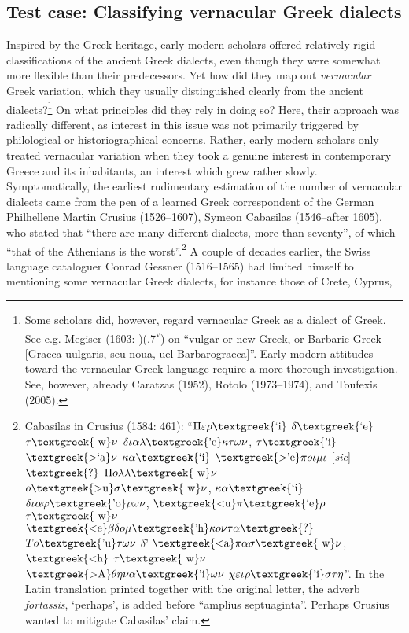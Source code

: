 \subsection{Test case: Classifying vernacular Greek dialects}
\hypertarget{Toc19704816}{}\begin{styleStandard}
Inspired by the Greek heritage, early modern scholars offered relatively rigid classifications of the ancient Greek dialects, even though they were somewhat more flexible than their predecessors. Yet how did they map out \textit{vernacular} Greek variation, which they usually distinguished clearly from the ancient dialects?\footnote{ Some scholars did, however, regard vernacular Greek as a dialect of Greek. See e.g. Megiser (1603: )(.7\textsc{\textsuperscript{v}}) on “vulgar or new Greek, or Barbaric Greek [Graeca uulgaris, seu noua, uel Barbarograeca]”. Early modern attitudes toward the vernacular Greek language require a more thorough investigation. See, however, already Caratzas (1952), Rotolo (1973–1974), and Toufexis (2005).} On what principles did they rely in doing so? Here, their approach was radically different, as interest in this issue was not primarily triggered by philological or historiographical concerns. Rather, early modern scholars only treated vernacular variation when they took a genuine interest in contemporary Greece and its inhabitants, an interest which grew rather slowly. Symptomatically, the earliest rudimentary estimation of the number of vernacular dialects came from the pen of a learned Greek correspondent of the German Philhellene Martin Crusius (1526–1607), Symeon Cabasilas (1546–after 1605), who stated that “there are many different dialects, more than seventy”, of which “that of the Athenians is the worst”.\footnote{ Cabasilas in Crusius (1584: 461): “$\Pi \varepsilon \rho \text{\textgreek{`i}}$ $\delta \text{\textgreek{`e}}$ $\tau \text{\textgreek{~w}}\nu $ $\delta \iota \alpha \lambda \text{\textgreek{'e}}\kappa \tau \omega \nu $, $\tau \text{\textgreek{'i}}$ $\text{\textgreek{>`a}}\nu $ $\kappa \alpha \text{\textgreek{`i}}$ $\text{\textgreek{>'e}}\pi o\iota \mu \iota $ [\textit{sic}]$\text{\textgreek{?}}$ $\Pi o\lambda \lambda \text{\textgreek{~w}}\nu $ $o\text{\textgreek{>u}}\sigma \text{\textgreek{~w}}\nu $, $\kappa \alpha \text{\textgreek{`i}}$ $\delta \iota \alpha \varphi \text{\textgreek{'o}}\rho \omega \nu $, $\text{\textgreek{<u}}\pi \text{\textgreek{`e}}\rho $ $\tau \text{\textgreek{~w}}\nu $ $\text{\textgreek{<e}}\beta \delta o\mu \text{\textgreek{'h}}\kappa o\nu \tau \alpha \text{\textgreek{?}}$ $To\text{\textgreek{'u}}\tau \omega \nu $ $\delta $' $\text{\textgreek{<a}}\pi \alpha \sigma \text{\textgreek{~w}}\nu $, $\text{\textgreek{<h}}$ $\tau \text{\textgreek{~w}}\nu $ $\text{\textgreek{>A}}\theta \eta \nu \alpha \text{\textgreek{'i}}\omega \nu $ $\chi \varepsilon \iota \rho \text{\textgreek{'i}}\sigma \tau \eta $”. In the Latin translation printed together with the original letter, the adverb \textit{fortassis}, ‘perhaps’, is added before “amplius septuaginta”. Perhaps Crusius wanted to mitigate Cabasilas’ claim.} A couple of decades earlier, the Swiss language cataloguer Conrad Gessner (1516–1565) had limited himself to mentioning some vernacular Greek dialects, for instance those of Crete, Cyprus, 
\end{styleStandard}
